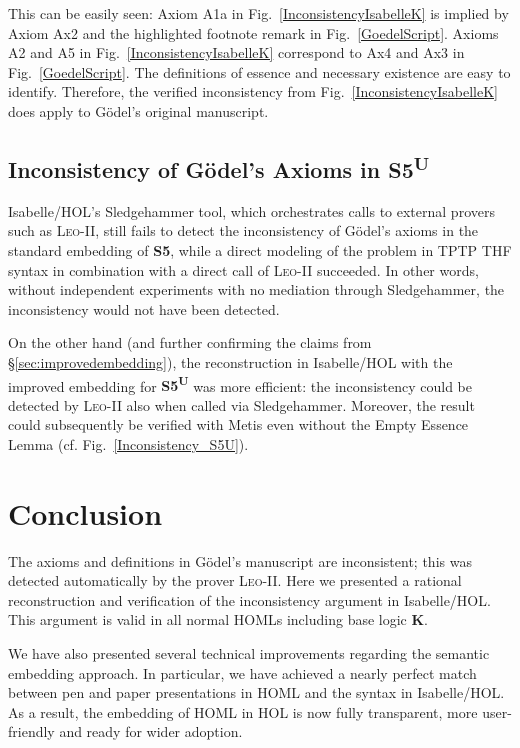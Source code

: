 \documentclass{article}
\newcommand{\logic}[1]{\textbf{#1}\xspace}
\newcommand{\K}{\logic{K}}
\newcommand{\SFive}{\logic{S5}}
\newcommand{\SFiveU}{\logic{S5\textsuperscript{U}}}
\begin{document}
This can be easily seen: Axiom A1a in
Fig.~\ref{InconsistencyIsabelleK} is implied by Axiom Ax2 and the
highlighted footnote remark in Fig.~\ref{GoedelScript}. Axioms A2 and
A5 in Fig.~\ref{InconsistencyIsabelleK} correspond to Ax4 and Ax3 in
Fig.~\ref{GoedelScript}. The definitions of essence and necessary
existence are easy to identify. Therefore, the verified
inconsistency from Fig.~\ref{InconsistencyIsabelleK} does apply to 
G\"odel's original manuscript.


\subsection{Inconsistency of G\"odel's Axioms in \SFiveU}

Isabelle/HOL's Sledgehammer tool, which orchestrates calls to
external provers such as \textsc{Leo-II}, still
fails to detect the inconsistency of G\"odel's axioms in the standard
embedding of \SFive, while a direct modeling of the problem in TPTP THF syntax
in combination with a direct call of \textsc{Leo-II} succeeded. In
other words, without independent experiments with no mediation through Sledgehammer, the
inconsistency would not have been detected.


On the other hand (and further confirming the claims from \S\ref{sec:improvedembedding}), 
the reconstruction in Isabelle/HOL with the improved embedding for \SFiveU was more efficient: 
the inconsistency could be detected
by \textsc{Leo-II} also when called via
Sledgehammer. Moreover, the result could subsequently be verified with
Metis even without the Empty Essence Lemma (cf. Fig.~\ref{Inconsistency_S5U}). 



\section{Conclusion}\label{sec:conclusion}

The axioms and definitions in G\"odel's manuscript are inconsistent;
this was detected automatically by the prover
\textsc{Leo-II}. Here we presented a rational reconstruction and
verification of the inconsistency argument in Isabelle/HOL. This
argument is valid in all normal HOMLs including base logic \K.

We have also presented several technical improvements regarding the
semantic embedding approach. In particular, we have achieved a
nearly perfect match between pen and paper presentations in HOML and
the syntax in Isabelle/HOL. As a result, the embedding of HOML in HOL
is now fully transparent, more user-friendly and ready for wider adoption.
\end{document}

